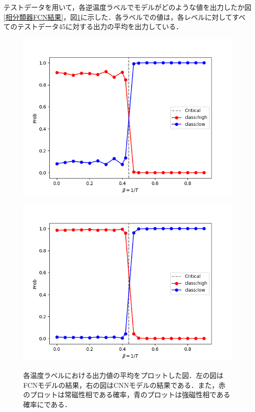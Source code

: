 \documentclass[a4paper,11pt]{jsreport}
\begin{document}
テストデータを用いて，各逆温度ラベルでモデルがどのような値を出力したか図\ref{相分類器FCN結果}，図\ref{相分類器CNN結果}に示した．各ラベルでの値は，各レベルに対してすべてのテストデータ45に対する出力の平均を出力している．
\begin{figure}[H]
  \begin{minipage}[b]{0.45\linewidth}
    \begin{center}
      \includegraphics[keepaspectratio, scale=0.4]{image/plot_square_FCNN.png}
      \label{相分類器FCN結果}
    \end{center}
  \end{minipage}
  \begin{minipage}[b]{0.45\linewidth}
    \begin{center}
      \includegraphics[keepaspectratio, scale=0.4]{image/plot_square_CNN.png}
      \label{相分類器CNN結果}
    \end{center}
  \end{minipage}
  \caption{各温度ラベルにおける出力値の平均をプロットした図．左の図はFCNモデルの結果，右の図はCNNモデルの結果である．また，赤のプロットは常磁性相である確率，青のプロットは強磁性相である確率にである．}
\end{figure}
\end{document}
